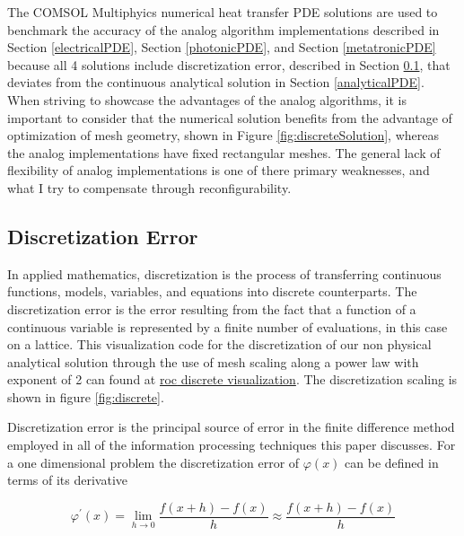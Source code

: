\par The COMSOL Multiphyics numerical heat transfer PDE solutions are used to benchmark the accuracy of the analog algorithm implementations described in Section \ref{electricalPDE}, Section \ref{photonicPDE}, and Section \ref{metatronicPDE} because all 4 solutions include discretization error, described in Section \ref{discretizationError}, that deviates from the continuous analytical solution in Section \ref{analyticalPDE}. When striving to showcase the advantages of the analog algorithms, it is important to consider that the numerical solution benefits from the advantage of optimization of mesh geometry, shown in Figure \ref{fig:discreteSolution}, whereas the analog implementations have fixed rectangular meshes. The general lack of flexibility of analog implementations is one of there primary weaknesses, and what I try to compensate through reconfigurability.


\subsection{Discretization Error}\label{discretizationError}

\par In applied mathematics, discretization is the process of transferring continuous functions, models, variables, and equations into discrete counterparts. The discretization error is the error resulting from the fact that a function of a continuous variable is represented by a finite number of evaluations, in this case on a lattice. This visualization code for the discretization of our non physical analytical solution through the use of mesh scaling along a power law with exponent of 2 can found at \href{https://github.com/openhpclgw/roc_discrete_visualization.git}{\acrshort{roc} discrete visualization}. The discretization scaling is shown in figure \ref{fig:discrete}.

\par Discretization error is the principal source of error in the finite difference method employed in all of the information processing techniques this paper discusses. For a one dimensional problem the discretization error of $\varphi\left(x\right)$ can be defined in terms of its derivative

\begin{equation}\label{eq:discretizationError1D}
  \varphi^{\prime}\left(x\right) = \lim _ { h \rightarrow 0 } \frac { f \left( x + h \right) - f \left( x \right) } { h } \approx \frac { f \left( x + h \right) - f \left( x \right) } { h }
\end{equation}

